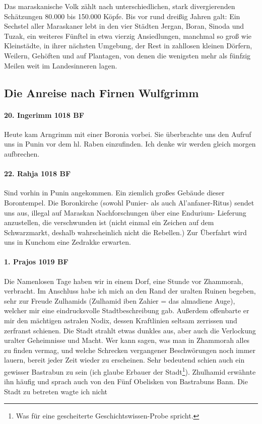 Das maraskanische Volk zählt nach unterschiedlichen, stark divergierenden Schätzungen 80.000 bis 150.000 Köpfe. Bis vor rund dreißig Jahren galt: Ein Sechstel aller Maraskaner lebt in den vier Städten Jergan, Boran, Sinoda und Tuzak, ein weiteres Fünftel in etwa vierzig Ansiedlungen, manchmal so groß wie Kleinstädte, in ihrer nächsten Umgebung, der Rest in zahllosen kleinen Dörfern, Weilern, Gehöften und auf Plantagen, von denen die wenigsten mehr als fünfzig Meilen weit im Landesinneren lagen.


\subsection{Die Anreise nach Firnen Wulfgrimm}
\paragraph{20. Ingerimm 1018 BF}
Heute kam Arngrimm mit einer Boronia vorbei. Sie überbrachte uns den Aufruf uns in Punin vor dem hl. Raben einzufinden. Ich denke wir werden gleich morgen aufbrechen.

\paragraph{22. Rahja 1018 BF}
Sind vorhin in Punin angekommen. Ein ziemlich großes Gebäude dieser Borontempel. Die Boronkirche (sowohl Punier- als auch Al'anfaner-Ritus) sendet uns aus, illegal auf Maraskan Nachforschungen über eine Endurium- Lieferung anzustellen, die verschwunden ist (nicht einmal ein Zeichen auf dem Schwarzmarkt, deshalb wahrscheinlich nicht die Rebellen.) Zur Überfahrt wird uns in Kunchom eine Zedrakke erwarten.

\paragraph{1. Prajos 1019 BF}
Die Namenlosen Tage haben wir in einem Dorf, eine Stunde vor Zhammorah, verbracht. Im Anschluss habe ich mich an den Rand der uralten Ruinen begeben, sehr zur Freude Zulhamids (Zulhamid iben Zahier = das almadiene Auge), welcher mir eine eindrucksvolle Stadtbeschreibung gab. Außerdem offenbarte er mir den mächtigen astralen Nodix, dessen Kraftlinien seltsam zerrissen und zerfranst schienen. Die Stadt strahlt etwas dunkles aus, aber auch die Verlockung uralter Geheimnisse und Macht. Wer kann sagen, was man in Zhammorah alles zu finden vermag, und welche Schrecken vergangener Beschwörungen noch immer lauern, bereit jeder Zeit wieder zu erscheinen. Sehr bedeutend schien auch ein gewisser Bastrabun zu sein (ich glaube Erbauer der Stadt\footnote{Was für eine gescheiterte Geschichtswissen-Probe spricht.}). Zhulhamid erwähnte ihn häufig und sprach auch von den Fünf Obelisken von Bastrabuns Bann. Die Stadt zu betreten wagte ich nicht

